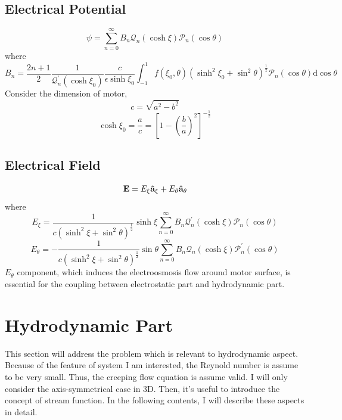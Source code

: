 \documentclass[fontsize=11pt, %
                             paper=a4, %
                             twoside, %
                             captions=tableheading,
                             index=totoc,
                             hyperref]{labbook}
\begin{document}
\begin{addmargin}[4cm]{0cm}
\subsection{Electrical Potential}
\begin{equation}
\psi=\sum_{n=0}^\infty B_n \mathscr{Q}_n(\cosh\xi)\mathscr{P}_n(\cos\theta)
\end{equation}
where
\begin{equation}
B_n=\frac{2n+1}{2}\frac{1}{\mathscr{Q}_n^\prime(\cosh\xi_0)}\frac{c}{\epsilon\sinh\xi_0}\int_{-1}^1f(\xi_0,\theta)(\sinh^2\xi_0+\sin^2\theta)^{\frac{1}{2}}\mathscr{P}_n(\cos\theta)\mathrm{d}\cos\theta
\end{equation}
Consider the dimension of motor, 
\begin{equation}
c=\sqrt{a^2-b^2}
\end{equation}
\begin{equation}
\cosh\xi_0=\frac{a}{c}=\left[1-\left(\frac{b}{a}\right)^2\right]^{-\frac{1}{2}}
\end{equation}
\subsection{Electrical Field}
\begin{equation}
\mathbf{E}=E_\xi \mathbf{\hat{a}}_\xi+E_\theta\mathbf{\hat{a}}_\theta
\end{equation}
where
\begin{equation}\label{Sln_E_xi}
E_\xi=\frac{1}{c(\sinh^2\xi+\sin^2\theta)^{\frac{1}{2}}}\sinh\xi\sum_{n=0}^\infty B_n \mathscr{Q}_n^\prime(\cosh\xi)\mathscr{P}_n(\cos\theta)
\end{equation}
\begin{equation}\label{Sln_E_theta}
E_\theta=-\frac{1}{c(\sinh^2\xi+\sin^2\theta)^{\frac{1}{2}}}\sin\theta\sum_{n=0}^\infty B_n\mathscr{Q}_n(\cosh\xi)\mathscr{P}_n^\prime(\cos\theta)
\end{equation}
$E_\theta$ component, which induces the electroosmosis flow around motor surface, is essential for the coupling between electrostatic part and hydrodynamic part.
\section{Hydrodynamic Part}
This section will address the problem which is relevant to hydrodynamic aspect. Because of the feature of system I am interested, the Reynold number is assume to be very small. Thus, the creeping flow equation is assume valid. I will only consider the axis-symmetrical case in 3D. Then, it's useful to introduce the concept of stream function.\cite{HappelBrenner1983} In the following contents, I will describe these aspects in detail.

\end{addmargin}
\end{document}

